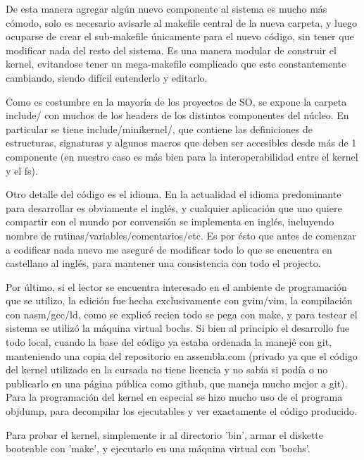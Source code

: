 De esta manera agregar algún nuevo componente al sistema es mucho más cómodo,
solo es necesario avisarle al makefile central de la nueva carpeta, y luego
ocuparse de crear el sub-makefile únicamente para el nuevo código, sin tener que
modificar nada del resto del sistema. Es una manera modular de construir el
kernel, evitandose tener un mega-makefile complicado que este constantemente
cambiando, siendo difícil entenderlo y editarlo.

Como es costumbre en la mayoría de los proyectos de SO, se expone la carpeta
include/ con muchos de los headers de los distintos componentes del núcleo. En
particular se tiene include/minikernel/, que contiene las definiciones de
estructuras, signaturas y algunos macros que deben ser accesibles desde más de
1 componente (en nuestro caso es más bien para la interoperabilidad entre el
kernel y el fs).

Otro detalle del código es el idioma. En la actualidad el idioma predominante
para desarrollar es obviamente el inglés, y cualquier aplicación que uno quiere
compartir con el mundo por convensión se implementa en inglés, incluyendo nombre
de rutinas/variables/comentarios/etc. Es por ésto que antes de comenzar a
codificar nada nuevo me aseguré de modificar todo lo que se encuentra en
castellano al inglés, para mantener una consistencia con todo el projecto.

Por último, si el lector se encuentra interesado en el ambiente de programación
que se utilizo, la edición fue hecha exclusivamente con gvim/vim, la compilación
con nasm/gcc/ld, como se explicó recien todo se pega con make, y para testear el
sistema se utilizó la máquina virtual bochs. Si bien al principio el desarrollo
fue todo local, cuando la base del código ya estaba ordenada la manejé con git,
manteniendo una copia del repositorio en assembla.com (privado ya que el código
del kernel utilizado en la cursada no tiene licencia y no sabía si podía o no
publicarlo en una página pública como github, que maneja mucho mejor a git).
Para la programación del kernel en especial se hizo mucho uso de el programa
objdump, para decompilar los ejecutables y ver exactamente el código producido.

Para probar el kernel, simplemente ir al directorio 'bin', armar el diskette
booteable con 'make', y ejecutarlo en una máquina virtual con 'bochs'.
